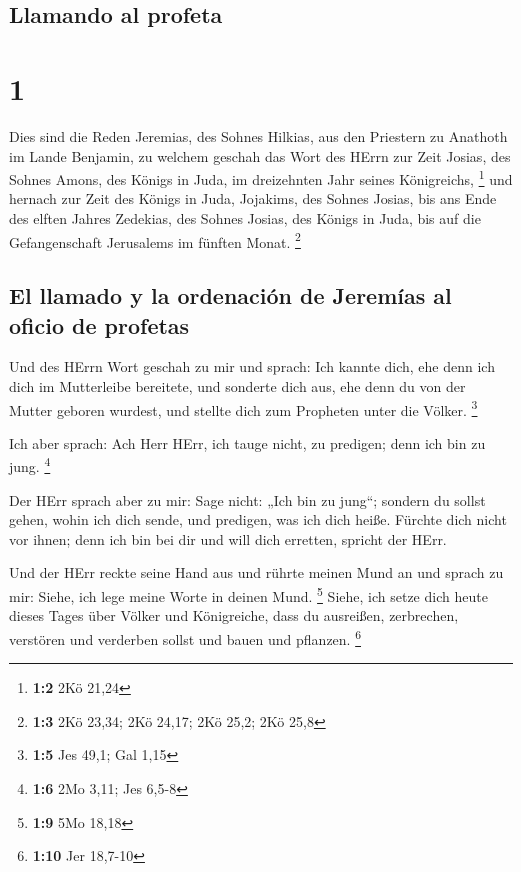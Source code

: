 \hypertarget{llamando-al-profeta}{%
\subsection{Llamando al profeta}\label{llamando-al-profeta}}

\hypertarget{section}{%
\section{1}\label{section}}

 Dies sind die Reden Jeremias, des Sohnes Hilkias, aus den
Priestern zu Anathoth im Lande Benjamin,  zu welchem
geschah das Wort des HErrn zur Zeit Josias, des Sohnes Amons, des Königs
in Juda, im dreizehnten Jahr seines Königreichs, \footnote{\textbf{1:2}
  2Kö 21,24}  und hernach zur Zeit des Königs in Juda,
Jojakims, des Sohnes Josias, bis ans Ende des elften Jahres Zedekias,
des Sohnes Josias, des Königs in Juda, bis auf die Gefangenschaft
Jerusalems im fünften Monat. \footnote{\textbf{1:3} 2Kö 23,34; 2Kö
  24,17; 2Kö 25,2; 2Kö 25,8}

\hypertarget{el-llamado-y-la-ordenaciuxf3n-de-jeremuxedas-al-oficio-de-profetas}{%
\subsection{El llamado y la ordenación de Jeremías al oficio de
profetas}\label{el-llamado-y-la-ordenaciuxf3n-de-jeremuxedas-al-oficio-de-profetas}}

 Und des HErrn Wort geschah zu mir und sprach:
 Ich kannte dich, ehe denn ich dich im Mutterleibe
bereitete, und sonderte dich aus, ehe denn du von der Mutter geboren
wurdest, und stellte dich zum Propheten unter die Völker. \footnote{\textbf{1:5}
  Jes 49,1; Gal 1,15}

 Ich aber sprach: Ach Herr HErr, ich tauge nicht, zu
predigen; denn ich bin zu jung. \footnote{\textbf{1:6} 2Mo 3,11; Jes
  6,5-8}

 Der HErr sprach aber zu mir: Sage nicht: „Ich bin zu
jung``; sondern du sollst gehen, wohin ich dich sende, und predigen, was
ich dich heiße.  Fürchte dich nicht vor ihnen; denn ich
bin bei dir und will dich erretten, spricht der HErr.

 Und der HErr reckte seine Hand aus und rührte meinen Mund
an und sprach zu mir: Siehe, ich lege meine Worte in deinen Mund.
\footnote{\textbf{1:9} 5Mo 18,18}  Siehe, ich setze dich
heute dieses Tages über Völker und Königreiche, dass du ausreißen,
zerbrechen, verstören und verderben sollst und bauen und pflanzen.
\footnote{\textbf{1:10} Jer 18,7-10}

